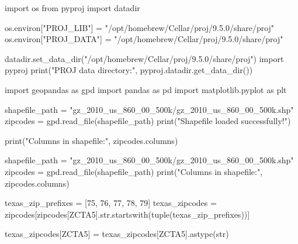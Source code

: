 \documentclass[
  letterpaper,
  DIV=11,
  numbers=noendperiod]{scrartcl}
\newenvironment{Shaded}{\begin{snugshade}}{\end{snugshade}}
\newcommand{\BuiltInTok}[1]{\textcolor[rgb]{0.00,0.23,0.31}{#1}}
\newcommand{\ImportTok}[1]{\textcolor[rgb]{0.00,0.46,0.62}{#1}}
\newcommand{\NormalTok}[1]{\textcolor[rgb]{0.00,0.23,0.31}{#1}}
\newcommand{\OperatorTok}[1]{\textcolor[rgb]{0.37,0.37,0.37}{#1}}
\newcommand{\StringTok}[1]{\textcolor[rgb]{0.13,0.47,0.30}{#1}}
\begin{document}
\begin{Shaded}
\begin{Highlighting}[]
\ImportTok{import}\NormalTok{ os}
\ImportTok{from}\NormalTok{ pyproj }\ImportTok{import}\NormalTok{ datadir}

\NormalTok{os.environ[}\StringTok{"PROJ\_LIB"}\NormalTok{] }\OperatorTok{=} \StringTok{"/opt/homebrew/Cellar/proj/9.5.0/share/proj"}
\NormalTok{os.environ[}\StringTok{"PROJ\_DATA"}\NormalTok{] }\OperatorTok{=} \StringTok{"/opt/homebrew/Cellar/proj/9.5.0/share/proj"}

\NormalTok{datadir.set\_data\_dir(}\StringTok{"/opt/homebrew/Cellar/proj/9.5.0/share/proj"}\NormalTok{)}
\ImportTok{import}\NormalTok{ pyproj}
\BuiltInTok{print}\NormalTok{(}\StringTok{"PROJ data directory:"}\NormalTok{, pyproj.datadir.get\_data\_dir())}


\ImportTok{import}\NormalTok{ geopandas }\ImportTok{as}\NormalTok{ gpd}
\ImportTok{import}\NormalTok{ pandas }\ImportTok{as}\NormalTok{ pd}
\ImportTok{import}\NormalTok{ matplotlib.pyplot }\ImportTok{as}\NormalTok{ plt}

\NormalTok{shapefile\_path }\OperatorTok{=} \StringTok{"gz\_2010\_us\_860\_00\_500k/gz\_2010\_us\_860\_00\_500k.shp"}
\NormalTok{zipcodes }\OperatorTok{=}\NormalTok{ gpd.read\_file(shapefile\_path)}
\BuiltInTok{print}\NormalTok{(}\StringTok{"Shapefile loaded successfully!"}\NormalTok{)}

\BuiltInTok{print}\NormalTok{(}\StringTok{"Columns in shapefile:"}\NormalTok{, zipcodes.columns)}

\NormalTok{shapefile\_path }\OperatorTok{=} \StringTok{"gz\_2010\_us\_860\_00\_500k/gz\_2010\_us\_860\_00\_500k.shp"}
\NormalTok{zipcodes }\OperatorTok{=}\NormalTok{ gpd.read\_file(shapefile\_path)}
\BuiltInTok{print}\NormalTok{(}\StringTok{"Columns in shapefile:"}\NormalTok{, zipcodes.columns)}

\NormalTok{texas\_zip\_prefixes }\OperatorTok{=}\NormalTok{ [}\StringTok{\textquotesingle{}75\textquotesingle{}}\NormalTok{, }\StringTok{\textquotesingle{}76\textquotesingle{}}\NormalTok{, }\StringTok{\textquotesingle{}77\textquotesingle{}}\NormalTok{, }\StringTok{\textquotesingle{}78\textquotesingle{}}\NormalTok{, }\StringTok{\textquotesingle{}79\textquotesingle{}}\NormalTok{]}
\NormalTok{texas\_zipcodes }\OperatorTok{=}\NormalTok{ zipcodes[zipcodes[}\StringTok{\textquotesingle{}ZCTA5\textquotesingle{}}\NormalTok{].}\BuiltInTok{str}\NormalTok{.startswith(}\BuiltInTok{tuple}\NormalTok{(texas\_zip\_prefixes))]}

\NormalTok{texas\_zipcodes[}\StringTok{\textquotesingle{}ZCTA5\textquotesingle{}}\NormalTok{] }\OperatorTok{=}\NormalTok{ texas\_zipcodes[}\StringTok{\textquotesingle{}ZCTA5\textquotesingle{}}\NormalTok{].astype(}\BuiltInTok{str}\NormalTok{)}


\end{Highlighting}
\end{Shaded}
\end{document}
